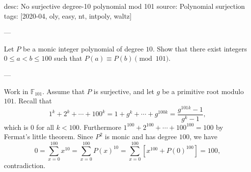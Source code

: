 desc: No surjective degree-10 polynomial mod 101
source: Polynomial surjection
tags: [2020-04, oly, easy, nt, intpoly, waltz]

---

Let $P$ be a monic integer polynomial of degree $10$. Show that there exist integers $0\le a<b\le100$ such that $P(a)\equiv P(b)\pmod{101}$.

---

Work in $\mathbb F_{101}$. Assume that $P$ is surjective, and let $g$ be a primitive root modulo $101$. Recall that \[1^k+2^k+\cdots+100^k=1+g^k+\cdots+g^{100k}=\frac{g^{101k}-1}{g^k-1},\]
which is $0$ for all $k<100$. Furthermore $1^{100}+2^{100}+\cdots+100^{100}=100$ by Fermat's little theorem. Since $P^2$ is monic and has degree $100$, we have \[0=\sum_{x=0}^{100}x^{10}=\sum_{x=0}^{100}P(x)^{10}=\sum_{x=0}^{100}\left[x^{100}+P(0)^{100}\right]=100,\]
contradiction.
